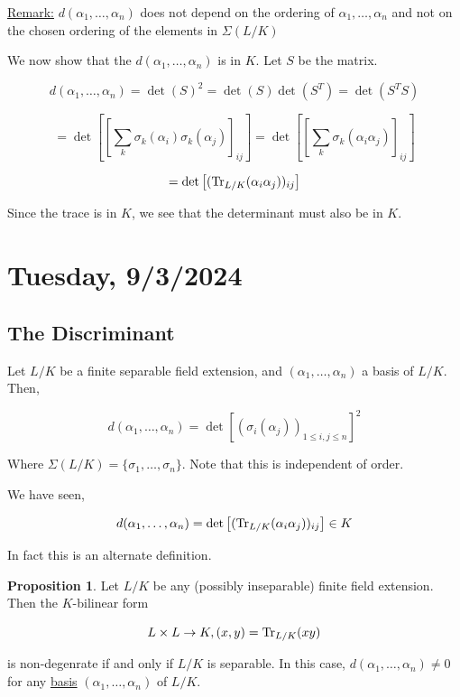 \documentclass[openany]{amsbook}
\numberwithin{section}{chapter}
\theoremstyle{definition}
\newtheorem{proposition}[theorem]{Proposition}
\begin{document}
\underline{Remark:} \(d(\alpha_1, \dots , \alpha_n)\) does not depend on the ordering of \(\alpha_1, \dots , \alpha_n\) and not on the chosen ordering of the elements in \(\Sigma(L / K)\) 

We now show that the \(d(\alpha_1, \dots , \alpha_n)\) is in \(K\). Let \(S\) be the matrix.

\[d(\alpha_1, \dots , \alpha_n) = \det(S)^2 = \det(S)\det(S^T) = \det (S^T S)\]

\[
    =\det \left[ \left[ \sum_{k} \sigma_k(\alpha_i)\sigma_k(\alpha_j) \right]_{ij}\right] = \det \left[ \left[ \sum_{k} \sigma_k(\alpha_i\alpha_j) \right]_{ij}\right]
\]
 
\[
    = \det \left[ (\Tr_{L / K} (\alpha_i \alpha_j) )_{ij} \right] 
\]

Since the trace is in \(K\), we see that the determinant must also be in \(K\).

\section*{Tuesday, 9/3/2024}

\subsection*{The Discriminant}

Let \(L / K\) be a finite separable field extension, and \((\alpha_1, \dots , \alpha_n)\) a basis of \(L / K\). Then,

\[
    d(\alpha_1, \dots , \alpha_n) = \det[(\sigma_i(\alpha_j))_{1 \le i,j \le n}]^2
\]

Where \(\Sigma(L / K) = \{ \sigma_1, \dots , \sigma_n \}\). Note that this is independent of order.

We have seen,

\[
    d(\alpha_1, \dots , \alpha_n) = \det \left[ (\Tr_{L / K}(\alpha_i \alpha_j))_{i j} \right] \in K
\]

In fact this is an alternate definition.

\begin{proposition}

    Let \(L / K\) be any (possibly inseparable) finite field extension. Then the \(K\)-bilinear form

    \[
        L \times L \to K, (x,y) = \Tr_{L / K}(xy)
    \]

is non-degenrate if and only if \(L / K\) is separable. In this case, \(d(\alpha_1, \dots , \alpha_n) \neq 0\) for any \underline{basis} \((\alpha_1, \dots , \alpha _n)\) of \(L / K\).

\end{proposition}
\end{document}
